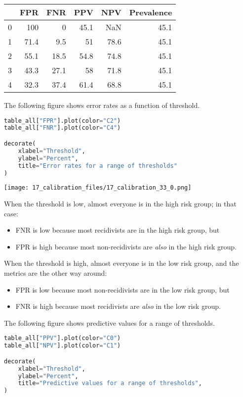 \begin{tabular}{lrrrrr}
\toprule
 & FPR & FNR & PPV & NPV & Prevalence \\
\midrule
0 & 100 & 0 & 45.1 & NaN & 45.1 \\
1 & 71.4 & 9.5 & 51 & 78.6 & 45.1 \\
2 & 55.1 & 18.5 & 54.8 & 74.8 & 45.1 \\
3 & 43.3 & 27.1 & 58 & 71.8 & 45.1 \\
4 & 32.3 & 37.4 & 61.4 & 68.8 & 45.1 \\
\bottomrule
\end{tabular}

The following figure shows error rates as a function of threshold.

\begin{lstlisting}[language=Python,style=source]
table_all["FPR"].plot(color="C2")
table_all["FNR"].plot(color="C4")

decorate(
    xlabel="Threshold",
    ylabel="Percent",
    title="Error rates for a range of thresholds"
)
\end{lstlisting}

\begin{center}
\texttt{[image: 17\_calibration\_files/17\_calibration\_33\_0.png]}
\end{center}

When the threshold is low, almost everyone is in the high risk group; in
that case:

\begin{itemize}
\item
  FNR is low because most recidivists are in the high risk group, but
\item
  FPR is high because most non-recidivists are \emph{also} in the high
  risk group.
\end{itemize}

When the threshold is high, almost everyone is in the low risk group,
and the metrics are the other way around:

\begin{itemize}
\item
  FPR is low because most non-recidivists are in the low risk group, but
\item
  FNR is high because most recidivists are \emph{also} in the low risk
  group.
\end{itemize}

The following figure shows predictive values for a range of thresholds.

\begin{lstlisting}[language=Python,style=source]
table_all["PPV"].plot(color="C0")
table_all["NPV"].plot(color="C1")

decorate(
    xlabel="Threshold",
    ylabel="Percent",
    title="Predictive values for a range of thresholds",
)
\end{lstlisting}

